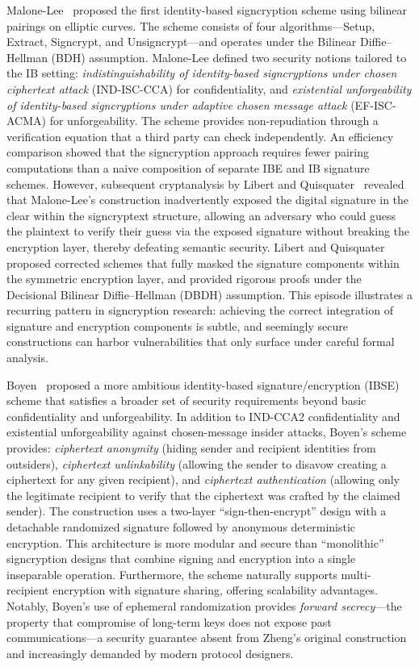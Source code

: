 \documentclass[conference]{IEEEtran}
\begin{document}
Malone-Lee~\cite{malonelee2002} proposed the first identity-based signcryption scheme using bilinear pairings on elliptic curves. The scheme consists of four algorithms---Setup, Extract, Signcrypt, and Unsigncrypt---and operates under the Bilinear Diffie--Hellman (BDH) assumption. Malone-Lee defined two security notions tailored to the IB setting: \textit{indistinguishability of identity-based signcryptions under chosen ciphertext attack} (IND-ISC-CCA) for confidentiality, and \textit{existential unforgeability of identity-based signcryptions under adaptive chosen message attack} (EF-ISC-ACMA) for unforgeability. The scheme provides non-repudiation through a verification equation that a third party can check independently. An efficiency comparison showed that the signcryption approach requires fewer pairing computations than a naive composition of separate IBE and IB signature schemes. However, subsequent cryptanalysis by Libert and Quisquater~\cite{libert2003} revealed that Malone-Lee's construction inadvertently exposed the digital signature in the clear within the signcryptext structure, allowing an adversary who could guess the plaintext to verify their guess via the exposed signature without breaking the encryption layer, thereby defeating semantic security. Libert and Quisquater proposed corrected schemes that fully masked the signature components within the symmetric encryption layer, and provided rigorous proofs under the Decisional Bilinear Diffie--Hellman (DBDH) assumption. This episode illustrates a recurring pattern in signcryption research: achieving the correct integration of signature and encryption components is subtle, and seemingly secure constructions can harbor vulnerabilities that only surface under careful formal analysis.

Boyen~\cite{boyen2003} proposed a more ambitious identity-based signature/encryption (IBSE) scheme that satisfies a broader set of security requirements beyond basic confidentiality and unforgeability. In addition to IND-CCA2 confidentiality and existential unforgeability against chosen-message insider attacks, Boyen's scheme provides: \textit{ciphertext anonymity} (hiding sender and recipient identities from outsiders), \textit{ciphertext unlinkability} (allowing the sender to disavow creating a ciphertext for any given recipient), and \textit{ciphertext authentication} (allowing only the legitimate recipient to verify that the ciphertext was crafted by the claimed sender). The construction uses a two-layer ``sign-then-encrypt'' design with a detachable randomized signature followed by anonymous deterministic encryption. This architecture is more modular and secure than ``monolithic'' signcryption designs that combine signing and encryption into a single inseparable operation. Furthermore, the scheme naturally supports multi-recipient encryption with signature sharing, offering scalability advantages. Notably, Boyen's use of ephemeral randomization provides \textit{forward secrecy}---the property that compromise of long-term keys does not expose past communications---a security guarantee absent from Zheng's original construction and increasingly demanded by modern protocol designers.
\end{document}
